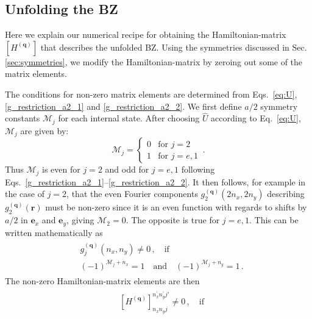 \documentclass[aps,pra,twocolumn,showpacs,superscriptaddress,floatfix,longbibliography]{revtex4-1}
\def\ex{\boldsymbol{e}_x}
\def\ey{\boldsymbol{e}_y}
\begin{document}
\begin{appendix}

\section{Unfolding the BZ}

\label{Appendix_A}

Here we explain our numerical recipe for obtaining the Hamiltonian-matrix $[H^{(\boldsymbol{q})}]$ that describes the unfolded BZ. Using the symmetries discussed in Sec. \ref{sec:symmetries}, we modify the Hamiltonian-matrix by zeroing out some of the matrix elements. 

The conditions for non-zero matrix elements are determined from Eqs.~\eqref{eq:U}, \eqref{g_restriction_a2_1} and \eqref{g_restriction_a2_2}.
We first define $a/2$ symmetry constants $\mathcal{M}_j$ for each internal state. After choosing $\hat{U}$ according to  Eq.~\eqref{eq:U}, $\mathcal{M}_j$ are given by:
%
\begin{equation}
\label{M_j}
\mathcal{M}_j = \begin{cases}
0 &\text{for $j=2$}\\
1 &\text{for $j=e,1$}
\end{cases} \, .
\end{equation}
%
Thus $\mathcal{M}_j$ is even for $j=2$ and odd for $j=e,1$ following Eqs.~\eqref{g_restriction_a2_1}--\eqref{g_restriction_a2_2}. It then follows, for example in the case of $j=2$, that the even Fourier components $g^{(\boldsymbol{q})}_2(2 n_x, 2 n_y)$ describing $g^{(\boldsymbol{q})}_2(\boldsymbol{r})$ must be non-zero since it is an even function with regards to shifts by $a/2$ in $\ex$ and $\ey$, giving $\mathcal{M}_2=0$. The opposite is true for $j=e,1$. This can be written mathematically as
%
\begin{gather} \label{g_nonzero}
\begin{aligned}
& g^{(\boldsymbol{q})}_j(n_x, n_y) \ne 0 \, , \quad \text{if} \\
& (-1)^{\mathcal{M}_j + n_x}= 1 \quad \text{and} \quad (-1)^{\mathcal{M}_j + n_y}=1 \, .
\end{aligned}
\end{gather}
%
The non-zero Hamiltonian-matrix elements are then
%
\begin{gather} \label{H_nonzero}
\begin{aligned}
& \left[ H^{(\boldsymbol{q})}  \right]^{n^{\prime}_x n^{\prime}_y j'}_{n_x n_y j} \ne 0 \, , \quad \text{if} \\

\end{aligned}
\end{gather}
\end{appendix}
\end{document}
